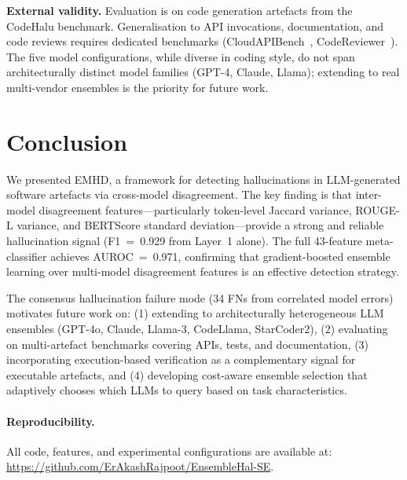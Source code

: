 \documentclass[11pt,a4paper]{article}
\newcommand{\method}{\textsc{EMHD}}
\begin{document}
\textbf{External validity.} Evaluation is on code generation artefacts from the CodeHalu benchmark. Generalisation to API invocations, documentation, and code reviews requires dedicated benchmarks (CloudAPIBench~\cite{jain2025codeapi}, CodeReviewer~\cite{li2022codereviewer}). The five model configurations, while diverse in coding style, do not span architecturally distinct model families (GPT-4, Claude, Llama); extending to real multi-vendor ensembles is the priority for future work.


\section{Conclusion}
\label{sec:conclusion}

We presented \method{}, a framework for detecting hallucinations in LLM-generated software artefacts via cross-model disagreement. The key finding is that inter-model disagreement features---particularly token-level Jaccard variance, ROUGE-L variance, and BERTScore standard deviation---provide a strong and reliable hallucination signal (F1~=~0.929 from Layer~1 alone). The full 43-feature meta-classifier achieves AUROC~=~0.971, confirming that gradient-boosted ensemble learning over multi-model disagreement features is an effective detection strategy.

The consensus hallucination failure mode (34 FNs from correlated model errors) motivates future work on: (1) extending to architecturally heterogeneous LLM ensembles (GPT-4o, Claude, Llama-3, CodeLlama, StarCoder2), (2) evaluating on multi-artefact benchmarks covering APIs, tests, and documentation, (3) incorporating execution-based verification as a complementary signal for executable artefacts, and (4) developing cost-aware ensemble selection that adaptively chooses which LLMs to query based on task characteristics.

\paragraph{Reproducibility.} All code, features, and experimental configurations are available at: \url{https://github.com/ErAkashRajpoot/EnsembleHal-SE}.
\end{document}
